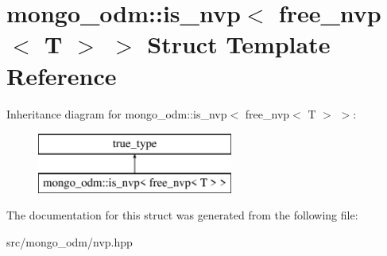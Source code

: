 \hypertarget{structmongo__odm_1_1is__nvp_3_01free__nvp_3_01T_01_4_01_4}{}\section{mongo\+\_\+odm\+:\+:is\+\_\+nvp$<$ free\+\_\+nvp$<$ T $>$ $>$ Struct Template Reference}
\label{structmongo__odm_1_1is__nvp_3_01free__nvp_3_01T_01_4_01_4}
Inheritance diagram for mongo\+\_\+odm\+:\+:is\+\_\+nvp$<$ free\+\_\+nvp$<$ T $>$ $>$\+:\begin{figure}[H]
\begin{center}
\leavevmode
\includegraphics[height=2.000000cm]{structmongo__odm_1_1is__nvp_3_01free__nvp_3_01T_01_4_01_4}
\end{center}
\end{figure}


The documentation for this struct was generated from the following file\+:\begin{DoxyCompactItemize}
\item 
src/mongo\+\_\+odm/nvp.\+hpp\end{DoxyCompactItemize}
